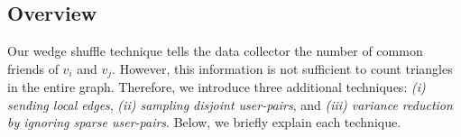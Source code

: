 \subsection{Overview}
\label{chap3-sub:triangle_overview}
Our wedge shuffle technique tells the data collector the number of common friends of $v_i$ and $v_j$.
However, this information is not sufficient to count triangles in the entire graph.
Therefore, we introduce
three additional techniques:
\textit{(i) sending local edges},
\textit{(ii) sampling disjoint user-pairs},
and
\textit{(iii) variance reduction by ignoring sparse user-pairs}.
Below, we briefly explain each technique.

